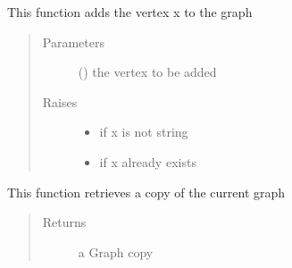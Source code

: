 \documentclass[letterpaper,10pt,english]{sphinxmanual}
\begin{document}
\begin{fulllineitems}
\begin{fulllineitems}
\end{fulllineitems}


\begin{fulllineitems}
\label{\detokenize{Graph:Graph.Graph.add_vertex}}
This function adds the vertex x to the graph
\begin{quote}\begin{description}
\item[{Parameters}] \leavevmode
{} () \textendash{} the vertex to be added

\item[{Raises}] \leavevmode\begin{itemize}
\item {} 
 \textendash{} if x is not string

\item {} 
 \textendash{} if x already exists

\end{itemize}

\end{description}\end{quote}

\end{fulllineitems}


\begin{fulllineitems}
\label{\detokenize{Graph:Graph.Graph.copy}}
This function retrieves a copy of the current graph
\begin{quote}\begin{description}
\item[{Returns}] \leavevmode
a Graph copy

\end{description}\end{quote}

\end{fulllineitems}



\end{fulllineitems}
\end{document}
